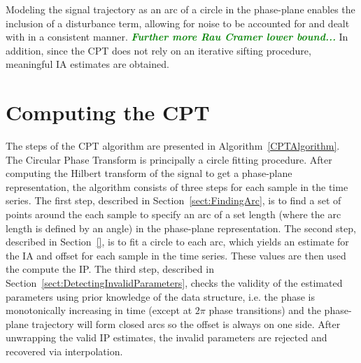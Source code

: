 \documentclass[a4paper]{IEEEtran}
\newcommand{\todo}[1]{\textsf{\emph{\textbf{\textcolor{blue}{#1}}}}}
\newcommand{\dean}[1]{\textsf{\emph{\textbf{\textcolor{green}{#1}}}}}
\begin{document}
Modeling the signal trajectory as an arc of a circle in the phase-plane enables the inclusion of a disturbance term, allowing for noise to be accounted for and dealt with in a consistent manner. \dean{Further more Rau Cramer lower bound...} In addition, since the CPT does not rely on an iterative sifting procedure, meaningful IA estimates are obtained.



\section{Computing the CPT}\label{sect:ComputingCPTSection}

The steps of the CPT algorithm are presented in Algorithm~\ref{CPTAlgorithm}. The Circular Phase Transform is principally a circle fitting procedure. After computing the Hilbert transform of the signal to get a phase-plane representation, the algorithm consists of three steps for each sample in the time series. 
The first step, described in Section~\ref{sect:FindingArc}, is to find a set of points around the each sample to specify an arc of a set length (where the arc length is defined by an angle) in the phase-plane representation. The second step, described in Section~\ref{}, is to fit a circle to each arc, which yields an estimate for the IA and offset for each sample in the time series. These values are then used the compute the IP. The third step, described in Section~\ref{sect:DetectingInvalidParameters}, checks the validity of the estimated parameters using prior knowledge of the data structure, i.e. the phase is monotonically increasing in time (except at $2\pi$ phase transitions) and the phase-plane trajectory will form closed arcs so the offset is always on one side. After unwrapping the valid IP estimates, the invalid parameters are rejected and recovered via interpolation. 
\end{document}
